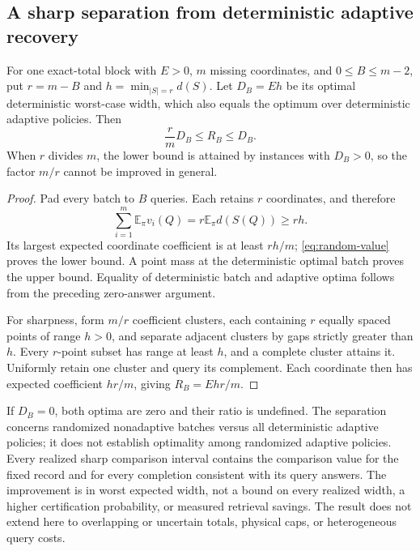 \subsection{A sharp separation from deterministic adaptive recovery}
\begin{proposition}
\label{prop:random-gap}
For one exact-total block with $E>0$, $m$ missing coordinates, and
$0\leq B\leq m-2$, put $r=m-B$ and
$h=\min_{|S|=r}d(S)$. Let $D_B=Eh$ be its optimal deterministic
worst-case width, which also equals the optimum over deterministic
adaptive policies. Then
\begin{equation}
 \frac{r}{m}D_B\leq R_B\leq D_B.
 \label{eq:random-gap}
\end{equation}
When $r$ divides $m$, the lower bound is attained by instances with
$D_B>0$, so the factor $m/r$ cannot be improved in general.
\end{proposition}
\begin{proof}
Pad every batch to $B$ queries. Each retains $r$ coordinates, and therefore
\[
 \sum_{i=1}^m\mathbb E_\pi v_i(Q)
 =r\mathbb E_\pi d(S(Q))\geq rh.
\]
Its largest expected coordinate coefficient is at least $rh/m$;
\eqref{eq:random-value} proves the lower bound. A point mass at the
deterministic optimal batch proves the upper bound. Equality of
deterministic batch and adaptive optima follows from the preceding
zero-answer argument.

For sharpness, form $m/r$ coefficient clusters, each containing $r$
equally spaced points of range $h>0$, and separate adjacent clusters
by gaps strictly greater than $h$. Every $r$-point subset has range
at least $h$, and a complete cluster attains it. Uniformly retain one
cluster and query its complement. Each coordinate then has expected
coefficient $hr/m$, giving $R_B=Ehr/m$.
\end{proof}

If $D_B=0$, both optima are zero and their ratio is undefined.
The separation concerns randomized nonadaptive batches versus all
deterministic adaptive policies; it does not establish optimality among
randomized adaptive policies. Every realized sharp comparison interval
contains the comparison value for the fixed record and for every completion
consistent with its query answers. The improvement is in worst expected width, not a bound
on every realized width, a higher certification probability, or measured
retrieval savings. The result does not extend here to overlapping or
uncertain totals, physical caps, or heterogeneous query costs.
